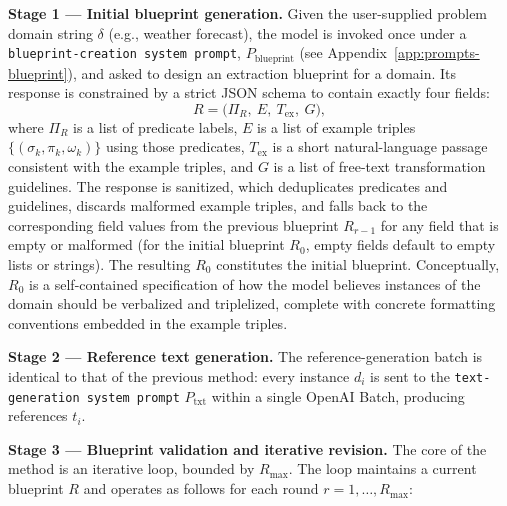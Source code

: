 \textbf{Stage 1 --- Initial blueprint generation.}
Given the user-supplied problem domain string $\delta$ (e.g., weather forecast), the model is invoked once under a \texttt{blueprint-creation system prompt}, $P_{\mathrm{blueprint}}$ (see Appendix~\ref{app:prompts-blueprint}), and asked to design an extraction blueprint for a domain. Its response is constrained by a strict JSON schema to contain exactly four fields:
$$R = \Big( \Pi_R,\ E,\ T_{\mathrm{ex}},\ G \Big),$$
where $\Pi_R$ is a list of predicate labels, $E$ is a list of example triples $\{(\sigma_k, \pi_k, \omega_k)\}$ using those predicates, $T_{\mathrm{ex}}$ is a short natural-language passage consistent with the example triples, and $G$ is a list of free-text transformation guidelines. The response is sanitized, which deduplicates predicates and guidelines, discards malformed example triples, and falls back to the corresponding field values from the previous blueprint $R_{r-1}$ for any field that is empty or malformed (for the initial blueprint $R_0$, empty fields default to empty lists or strings). The resulting $R_0$ constitutes the initial blueprint. Conceptually, $R_0$ is a self-contained specification of how the model believes instances of the domain should be verbalized and triplelized, complete with concrete formatting conventions embedded in the example triples.

\textbf{Stage 2 --- Reference text generation.}
The reference-generation batch is identical to that of the previous method: every instance $d_i$ is sent to the \texttt{text-generation system prompt} $P_{\mathrm{txt}}$ within a single OpenAI Batch, producing references $t_i$.

\textbf{Stage 3 --- Blueprint validation and iterative revision.}
The core of the method is an iterative loop, bounded by $R_{\max}$. The loop maintains a current blueprint $R$ and operates as follows for each round $r = 1, \dots, R_{\max}$:

